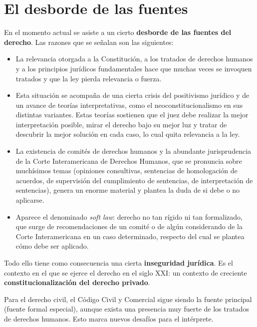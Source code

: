 \documentclass[12pt,oneside]{book}
\begin{document}
\section{El desborde de las fuentes}

En el momento actual se asiste a un cierto \textbf{desborde de las fuentes del derecho}. Las razones que se señalan son las siguientes:

\begin{itemize}
    \item La relevancia otorgada a la Constitución, a los tratados de derechos humanos y a los principios jurídicos fundamentales hace que muchas veces se invoquen tratados y que la ley pierda relevancia o fuerza.
    \item Esta situación se acompaña de una cierta crisis del positivismo jurídico y de un avance de teorías interpretativas, como el neoconstitucionalismo en sus distintas variantes. Estas teorías sostienen que el juez debe realizar la mejor interpretación posible, mirar el derecho bajo su mejor luz y tratar de descubrir la mejor solución en cada caso, lo cual quita relevancia a la ley.
    \item La existencia de comités de derechos humanos y la abundante jurisprudencia de la Corte Interamericana de Derechos Humanos, que se pronuncia sobre muchísimos temas (opiniones consultivas, sentencias de homologación de acuerdos, de supervisión del cumplimiento de sentencias, de interpretación de sentencias), genera un enorme material y plantea la duda de si debe o no aplicarse.
    \item Aparece el denominado \textit{soft law}: derecho no tan rígido ni tan formalizado, que surge de recomendaciones de un comité o de algún considerando de la Corte Interamericana en un caso determinado, respecto del cual se plantea cómo debe ser aplicado.
\end{itemize}

Todo ello tiene como consecuencia una cierta \textbf{inseguridad jurídica}. Es el contexto en el que se ejerce el derecho en el siglo XXI: un contexto de creciente \textbf{constitucionalización del derecho privado}.

\begin{important}
Para el derecho civil, el Código Civil y Comercial sigue siendo la fuente principal (fuente formal especial), aunque exista una presencia muy fuerte de los tratados de derechos humanos. Esto marca nuevos desafíos para el intérprete.
\end{important}
\end{document}
